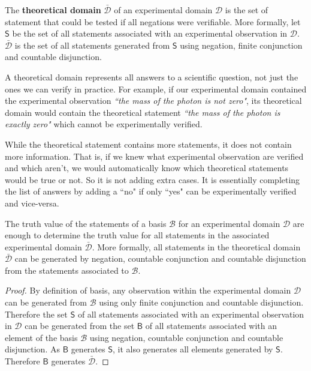 \documentclass[11pt,letterpaper,fleqn]{memoir} %
\begin{document}
\begin{mathSection}
\begin{defn}
	The \textbf{theoretical domain} $\bar{\mathcal{D}}$ of an experimental domain $\mathcal{D}$ is the set of statement that could be tested if all negations were verifiable. More formally, let $\mathsf{S}$ be the set of all statements associated with an experimental observation in $\mathcal{D}$. $\bar{\mathcal{D}}$ is the set of all statements generated from $\mathsf{S}$ using negation, finite conjunction and countable disjunction.
\end{defn}
\end{mathSection}

A theoretical domain represents all answers to a scientific question, not just the ones we can verify in practice. For example, if our experimental domain contained the experimental observation \emph{``the mass of the photon is not zero"}, its theoretical domain would contain the theoretical statement \emph{``the mass of the photon is exactly zero"} which cannot be experimentally verified.

While the theoretical statement contains more statements, it does not contain more information. That is, if we knew what experimental observation are verified and which aren't, we would automatically know which theoretical statements would be true or not. So it is not adding extra cases. It is essentially completing the list of answers by adding a ``no" if only ``yes" can be experimentally verified and vice-versa.

\begin{mathSection}
\begin{prop}
	The truth value of the statements of a basis $\mathcal{B}$ for an experimental domain $\mathcal{D}$ are enough to determine the truth value for all statements in the associated experimental domain $\bar{\mathcal{D}}$. More formally, all statements in the theoretical domain $\bar{\mathcal{D}}$ can be generated by negation, countable conjunction and countable disjunction from the statements associated to $\mathcal{B}$.
\end{prop}

\begin{proof}
	By definition of basis, any observation within the experimental domain $\mathcal{D}$ can be generated from $\mathcal{B}$ using only finite conjunction and countable disjunction. Therefore the set $\mathsf{S}$ of all statements associated with an experimental observation in $\mathcal{D}$ can be generated from the set $\mathsf{B}$ of all statements associated with an element of the basis $\mathcal{B}$ using negation, countable conjunction and countable disjunction. As $\mathsf{B}$ generates $\mathsf{S}$, it also generates all elements generated by $\mathsf{S}$. Therefore $\mathsf{B}$ generates $\bar{\mathcal{D}}$.
\end{proof}
\end{mathSection}
\end{document}
